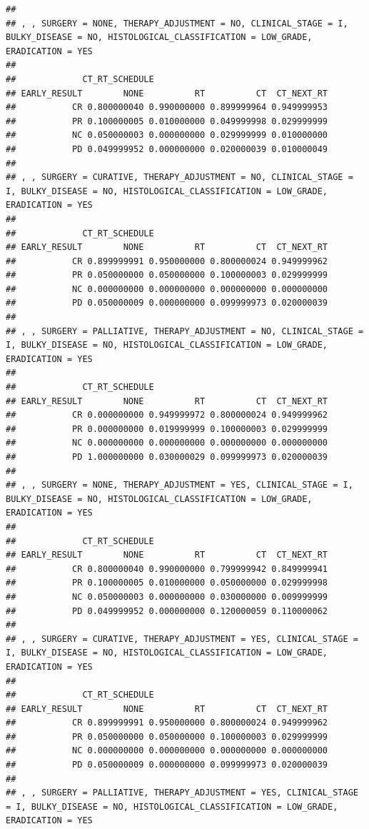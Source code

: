 \documentclass[]{article}
\begin{document}
\begin{verbatim}
## 
## , , SURGERY = NONE, THERAPY_ADJUSTMENT = NO, CLINICAL_STAGE = I, BULKY_DISEASE = NO, HISTOLOGICAL_CLASSIFICATION = LOW_GRADE, ERADICATION = YES
## 
##             CT_RT_SCHEDULE
## EARLY_RESULT        NONE          RT          CT  CT_NEXT_RT
##           CR 0.800000040 0.990000000 0.899999964 0.949999953
##           PR 0.100000005 0.010000000 0.049999998 0.029999999
##           NC 0.050000003 0.000000000 0.029999999 0.010000000
##           PD 0.049999952 0.000000000 0.020000039 0.010000049
## 
## , , SURGERY = CURATIVE, THERAPY_ADJUSTMENT = NO, CLINICAL_STAGE = I, BULKY_DISEASE = NO, HISTOLOGICAL_CLASSIFICATION = LOW_GRADE, ERADICATION = YES
## 
##             CT_RT_SCHEDULE
## EARLY_RESULT        NONE          RT          CT  CT_NEXT_RT
##           CR 0.899999991 0.950000000 0.800000024 0.949999962
##           PR 0.050000000 0.050000000 0.100000003 0.029999999
##           NC 0.000000000 0.000000000 0.000000000 0.000000000
##           PD 0.050000009 0.000000000 0.099999973 0.020000039
## 
## , , SURGERY = PALLIATIVE, THERAPY_ADJUSTMENT = NO, CLINICAL_STAGE = I, BULKY_DISEASE = NO, HISTOLOGICAL_CLASSIFICATION = LOW_GRADE, ERADICATION = YES
## 
##             CT_RT_SCHEDULE
## EARLY_RESULT        NONE          RT          CT  CT_NEXT_RT
##           CR 0.000000000 0.949999972 0.800000024 0.949999962
##           PR 0.000000000 0.019999999 0.100000003 0.029999999
##           NC 0.000000000 0.000000000 0.000000000 0.000000000
##           PD 1.000000000 0.030000029 0.099999973 0.020000039
## 
## , , SURGERY = NONE, THERAPY_ADJUSTMENT = YES, CLINICAL_STAGE = I, BULKY_DISEASE = NO, HISTOLOGICAL_CLASSIFICATION = LOW_GRADE, ERADICATION = YES
## 
##             CT_RT_SCHEDULE
## EARLY_RESULT        NONE          RT          CT  CT_NEXT_RT
##           CR 0.800000040 0.990000000 0.799999942 0.849999941
##           PR 0.100000005 0.010000000 0.050000000 0.029999998
##           NC 0.050000003 0.000000000 0.030000000 0.009999999
##           PD 0.049999952 0.000000000 0.120000059 0.110000062
## 
## , , SURGERY = CURATIVE, THERAPY_ADJUSTMENT = YES, CLINICAL_STAGE = I, BULKY_DISEASE = NO, HISTOLOGICAL_CLASSIFICATION = LOW_GRADE, ERADICATION = YES
## 
##             CT_RT_SCHEDULE
## EARLY_RESULT        NONE          RT          CT  CT_NEXT_RT
##           CR 0.899999991 0.950000000 0.800000024 0.949999962
##           PR 0.050000000 0.050000000 0.100000003 0.029999999
##           NC 0.000000000 0.000000000 0.000000000 0.000000000
##           PD 0.050000009 0.000000000 0.099999973 0.020000039
## 
## , , SURGERY = PALLIATIVE, THERAPY_ADJUSTMENT = YES, CLINICAL_STAGE = I, BULKY_DISEASE = NO, HISTOLOGICAL_CLASSIFICATION = LOW_GRADE, ERADICATION = YES

\end{verbatim}
\end{document}
